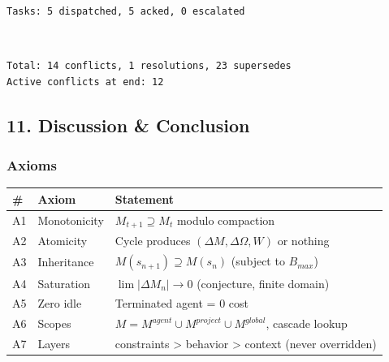 \documentclass[11pt]{article}
\begin{document}
    \begin{Verbatim}[commandchars=\\\{\}]
Tasks: 5 dispatched, 5 acked, 0 escalated
    \end{Verbatim}

    \begin{center}
    \end{center}
    { \hspace*{\fill} \\}
    
    \begin{Verbatim}[commandchars=\\\{\}]
Total: 14 conflicts, 1 resolutions, 23 supersedes
Active conflicts at end: 12
    \end{Verbatim}

    \subsection{11. Discussion \& Conclusion}\label{discussion-conclusion}

\subsubsection{Axioms}\label{axioms}

\begin{longtable}[]{@{}
  >{\raggedright\arraybackslash}p{}
  >{\raggedright\arraybackslash}p{}
  >{\raggedright\arraybackslash}p{}@{}}
\toprule\noalign{}
\begin{minipage}[b]{\linewidth}\raggedright
\#
\end{minipage} & \begin{minipage}[b]{\linewidth}\raggedright
Axiom
\end{minipage} & \begin{minipage}[b]{\linewidth}\raggedright
Statement
\end{minipage} \\
\midrule\noalign{}
\endhead
\bottomrule\noalign{}
\endlastfoot
A1 & Monotonicity & \(M_{t+1} \supseteq M_t\) modulo compaction \\
A2 & Atomicity & Cycle produces \((\Delta M, \Delta\Omega, W)\) or
nothing \\
A3 & Inheritance & \(M(s_{n+1}) \supseteq M(s_n)\) (subject to
\(B_{max}\)) \\
A4 & Saturation & \(\lim |\Delta M_n| \to 0\) (conjecture, finite
domain) \\
A5 & Zero idle & Terminated agent = 0 cost \\
A6 & Scopes & \(M = M^{agent} \cup M^{project} \cup M^{global}\),
cascade lookup \\
A7 & Layers & constraints \textgreater{} behavior \textgreater{} context
(never overridden) \\
\end{longtable}
\end{document}

